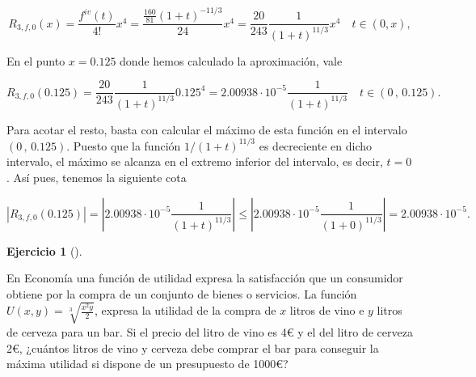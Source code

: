 \documentclass[
  spanish,
  a4paper,
]{scrreport}
\theoremstyle{definition}
\newtheorem{exercise}{Ejercicio}[chapter]
\theoremstyle{remark}
\begin{document}
\begin{tcolorbox}
\[
R_{3,f,0}(x) 
=\frac{f^{iv}(t)}{4!}x^4
=\frac{\frac{160}{81} (1+t)^{-11/3}}{24}x^4 
= \frac{20}{243}\frac{1}{(1+t)^{11/3}} x^4 \quad t\in(0,x),
\]

En el punto \(x=0.125\) donde hemos calculado la aproximación, vale

\[
R_{3,f,0}(0.125)
=\frac{20}{243}\frac{1}{(1+t)^{11/3}} 0.125^4
= 2.00938\cdot 10^{-5}\frac{1}{(1+t)^{11/3}} \quad t\in(0\,,\,0.125).
\]

Para acotar el resto, basta con calcular el máximo de esta función en el
intervalo \((0\,,\,0.125)\). Puesto que la función \(1/(1+t)^{11/3}\) es
decreciente en dicho intervalo, el máximo se alcanza en el extremo
inferior del intervalo, es decir, \(t=0\). Así pues, tenemos la
siguiente cota

\[
|R_{3,f,0}(0.125)|
= \left|2.00938\cdot 10^{-5}\frac{1}{(1+t)^{11/3}}\right|
\leq \left|2.00938\cdot 10^{-5}\frac{1}{(1+0)^{11/3}}\right|
=2.00938\cdot 10^{-5}.
\]

\end{tcolorbox}

\begin{exercise}[]\protect\hypertarget{exr-7}{}\label{exr-7}

En Economía una función de utilidad expresa la satisfacción que un
consumidor obtiene por la compra de un conjunto de bienes o servicios.
La función \(U(x,y)=\sqrt[3]{\frac{x^2y}{2}}\), expresa la utilidad de
la compra de \(x\) litros de vino e \(y\) litros de cerveza para un bar.
Si el precio del litro de vino es 4€ y el del litro de cerveza 2€,
¿cuántos litros de vino y cerveza debe comprar el bar para conseguir la
máxima utilidad si dispone de un presupuesto de 1000€?

\end{exercise}
\end{document}
